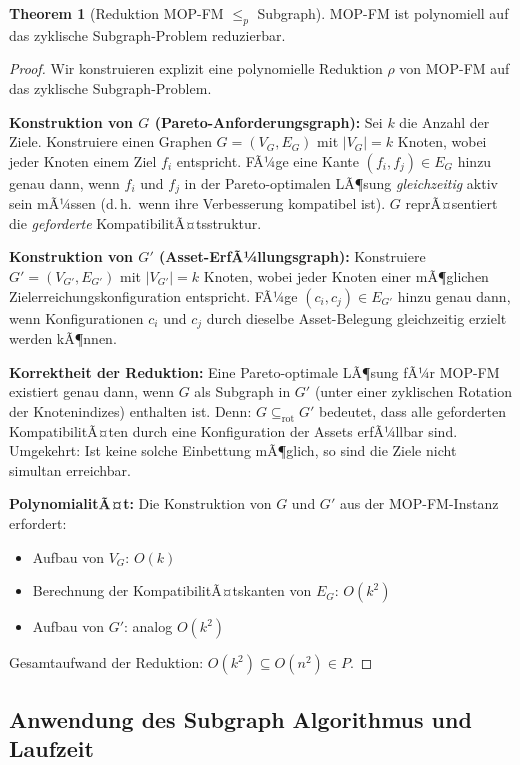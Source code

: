﻿\documentclass[a4paper,12pt]{article}
\theoremstyle{definition}
\newtheorem{theorem}{Theorem}[section]
\begin{document}
\begin{theorem}[Reduktion MOP-FM $\leq_p$ Subgraph]
\label{thm:mop-red}
MOP-FM ist polynomiell auf das zyklische Subgraph-Problem reduzierbar.
\end{theorem}

\begin{proof}
Wir konstruieren explizit eine polynomielle Reduktion $\rho$ von MOP-FM auf
das zyklische Subgraph-Problem.

\textbf{Konstruktion von $G$ (Pareto-Anforderungsgraph):}
Sei $k$ die Anzahl der Ziele. Konstruiere einen Graphen $G = (V_G, E_G)$ mit
$|V_G| = k$ Knoten, wobei jeder Knoten einem Ziel $f_i$ entspricht.
FÃ¼ge eine Kante $(f_i, f_j) \in E_G$ hinzu genau dann, wenn $f_i$ und $f_j$
in der Pareto-optimalen LÃ¶sung \emph{gleichzeitig} aktiv sein mÃ¼ssen
(d.\,h.\ wenn ihre Verbesserung kompatibel ist).
$G$ reprÃ¤sentiert die \emph{geforderte} KompatibilitÃ¤tsstruktur.

\textbf{Konstruktion von $G'$ (Asset-ErfÃ¼llungsgraph):}
Konstruiere $G' = (V_{G'}, E_{G'})$ mit $|V_{G'}| = k$ Knoten,
wobei jeder Knoten einer mÃ¶glichen Zielerreichungskonfiguration entspricht.
FÃ¼ge $(c_i, c_j) \in E_{G'}$ hinzu genau dann, wenn Konfigurationen $c_i$ und $c_j$
durch dieselbe Asset-Belegung gleichzeitig erzielt werden kÃ¶nnen.

\textbf{Korrektheit der Reduktion:}
Eine Pareto-optimale LÃ¶sung fÃ¼r MOP-FM existiert genau dann, wenn $G$ als Subgraph
in $G'$ (unter einer zyklischen Rotation der Knotenindizes) enthalten ist.
Denn: $G \subseteq_{\mathrm{rot}} G'$ bedeutet, dass alle geforderten KompatibilitÃ¤ten
durch eine Konfiguration der Assets erfÃ¼llbar sind.
Umgekehrt: Ist keine solche Einbettung mÃ¶glich, so sind die Ziele nicht simultan erreichbar.

\textbf{PolynomialitÃ¤t:}
Die Konstruktion von $G$ und $G'$ aus der MOP-FM-Instanz erfordert:
\begin{itemize}
    \item Aufbau von $V_G$: $O(k)$
    \item Berechnung der KompatibilitÃ¤tskanten von $E_G$: $O(k^2)$
    \item Aufbau von $G'$: analog $O(k^2)$
\end{itemize}
Gesamtaufwand der Reduktion: $O(k^2) \subseteq O(n^2) \in P$.
\end{proof}

\subsection{Anwendung des Subgraph Algorithmus und Laufzeit}
\end{document}
